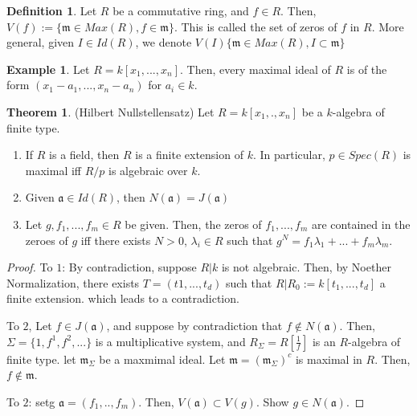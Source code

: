 \documentclass{article}
\theoremstyle{definition}
\newtheorem{theorem}{Theorem}[section]
\theoremstyle{definition}
\theoremstyle{definition}
\theoremstyle{definition}
\theoremstyle{definition}
\newtheorem{definition}{Definition}[section]
\theoremstyle{definition}
\theoremstyle{definition}
\newtheorem{example}{Example}[section]
\begin{document}
\begin{tcolorbox}[colback=purple!5!white,colframe=purple!75!black]
\begin{definition}
Let $R$ be a commutative ring, and $f\in R$. Then, $V(f):=\{\mathfrak{m}\in Max(R), f\in \mathfrak{m}\}$. This is called the set of zeros of $f$ in $R$. More general, given $I\in Id(R)$, we denote $V(I)\{\mathfrak{m}\in Max(R), I\subset \mathfrak{m}\}$
\end{definition}
\end{tcolorbox}

\begin{tcolorbox}[colback=yellow!5!white,colframe=yellow!30!white]
\begin{example}
Let $R=k[x_1,...,x_n]$. Then, every maximal ideal of $R$ is of the form $(x_1-a_1,...,x_n-a_n)$ for $a_i\in k$. 
\end{example}
\end{tcolorbox}


\begin{tcolorbox}[colback=red!5!white,colframe=red!30!white]
\begin{theorem}
(Hilbert Nullstellensatz) Let $R=k[x_1,.,x_n]$ be a $k$-algebra of finite type. 
\begin{enumerate}
    \item If $R$ is a field, then $R$ is a finite extension of $k$. In particular, $p\in Spec(R)$ is maximal iff $R/p$ is algebraic over $k$. 
    \item Given $\mathfrak{a}\in Id(R)$, then $N(\mathfrak{a})=J(\mathfrak{a})$
    \item Let $g, f_1,...,f_m\in R$ be given. Then, the zeros of $f_1,...,f_m$ are contained in the zeroes of $g$ iff there exists $N>0$, $\lambda_i\in R$ such that $g^N=f_1\lambda_1+...+f_m\lambda_m$. 
\end{enumerate}
\end{theorem}
\end{tcolorbox}
\begin{proof}
    To $1$: By contradiction, suppose $R|k$ is not algebraic. Then, by Noether Normalization, there exists $T=(t1,...,t_d)$ such that $R|R_0:=k[t_1,...,t_d]$ a finite extension. which leads to a contradiction. 

    To $2$, Let $f\in J(\mathfrak{a})$, and suppose by contradiction that $f\not\in N(\mathfrak{a})$. Then, $\Sigma=\{1,f^1,f^2,...\}$ is a multiplicative system, and $R_{\Sigma}=R[\frac{1}{f}]$ is an $R$-algebra of finite type. let $\mathfrak{m}_{\Sigma}$ be a maxmimal ideal. Let $\mathfrak{m}=(\mathfrak{m}_{\Sigma})^{c}$ is maximal in $R$. Then, $f\not \in \mathfrak{m}$. 

    To $2$: setg $\mathfrak{a}=(f_1,..,f_m)$. Then, $V(\mathfrak{a})\subset V(g)$. Show $g\in N(\mathfrak{a})$. 

\end{proof}
\end{document}

